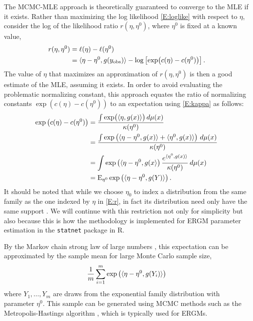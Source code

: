 The MCMC-MLE approach is theoretically guaranteed to converge to the MLE if it exists.  
Rather than maximizing the log likelihood \eqref{E:loglike}
with respect to $\eta$, \citeauthor{Geyer:1992} consider 
the log of the likelihood ratio $r( \eta, \eta^0 )$, where $\eta^0$ 
is fixed at a known value,
\begin{align}
 r( \eta, \eta^0 ) &= \ell( \eta ) - \ell( \eta^0 ) \notag \\ 
				  &= \langle  \eta - \eta^0, g(y_{\text{obs}}) \rangle - \log \left [ \exp \bigl( c(\eta) - c(\eta^0) \bigr) \right ].\label{E:r}
\end{align}
The value of $\eta$ that maximizes an
approximation of $r( \eta, \eta^0 )$ is then a good estimate of the MLE, 
assuming it exists.  In order to avoid evaluating the problematic normalizing constant,
this approach equates the ratio of normalizing constants 
$\exp \left (  c(\eta) - c(\eta^0) \right )$ to an expectation 
using \eqref{E:kappa} as follows:
\begin{align*}
	\exp \left (  c(\eta) - c(\eta^0) \right ) &= \frac{ \int \exp \bigl ( \langle  \eta, g(x)  \rangle\bigr ) \, d\mu(x) }{ \kappa(\eta^0)  } \\
	&= \frac{ \int \exp \left ( \langle  \eta - \eta^0, g(x) \rangle + \langle  \eta^0, g(x) \rangle \right ) \, d\mu(x)  }{ \kappa(\eta^0) } \\
	&= \int \exp \left( \langle \eta - \eta^0, g(x \rangle \right ) \frac{ e^ { \langle  \eta^0, g(x) \rangle } }{ \kappa(\eta^0) } \, d\mu(x)\\
	&= \operatorname{E}_{\eta^0} \exp \left( \langle  \eta - \eta^0, g(Y) \rangle  \right ) .
\end{align*}
It should be noted that while we choose $\eta_0$ to index a distribution from the same
family as the one indexed by $\eta$ in \eqref{E:r}, in fact its distribution need 
only have the same support \citep[pp.~251--256]{Gilks:1996}.
We will continue with this restriction not only for simplicity but also because this is how
the methodology is implemented for ERGM parameter estimation in the \texttt{statnet} package
\citep{statnet:R} in R.

By the Markov chain strong law of large numbers \citep[Theorem 17.0.1]{Meyn:2009}, 
this expectation can be approximated by the sample mean for large Monte Carlo sample 
size,
\begin{align*}
	\frac{1}{m} \sum_{i=1}^{m}\exp \left ( \langle  \eta - \eta^0,g(Y_i) \rangle \right )
\end{align*}
where $Y_1, \ldots, Y_m$ are draws from the exponential family distribution with 
parameter $\eta^0$.  This sample can be generated using MCMC 
methods such as the Metropolis-Hastings algorithm \citep[Chapter 1]{Brooks}, which
is typically used for ERGMs.

